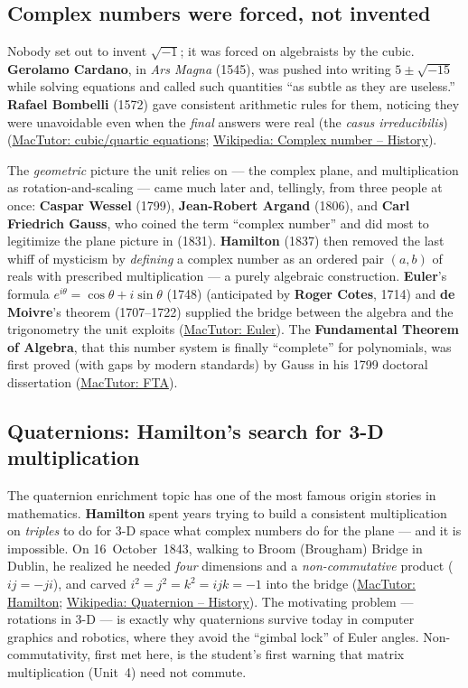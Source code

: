 \documentclass[11pt]{article}
\newcommand{\who}[1]{{\sffamily\bfseries #1}}
\newcommand{\yr}[1]{{\sffamily\color{BrickRed}(#1)}}
\begin{document}
\subsection{Complex numbers were forced, not invented}
Nobody set out to invent $\sqrt{-1}$; it was forced on algebraists by the cubic.
\who{Gerolamo Cardano}, in \emph{Ars Magna} \yr{1545}, was pushed into writing
$5\pm\sqrt{-15}$ while solving equations and called such quantities ``as subtle as
they are useless.'' \who{Rafael Bombelli} \yr{1572} gave consistent arithmetic
rules for them, noticing they were unavoidable even when the \emph{final} answers
were real (the \emph{casus irreducibilis})
(\href{https://mathshistory.st-andrews.ac.uk/HistTopics/Quadratic_etc_equations/}{MacTutor:
cubic/quartic equations};
\href{https://en.wikipedia.org/wiki/Complex_number\#History}{Wikipedia: Complex
number -- History}).

The \emph{geometric} picture the unit relies on --- the complex plane, and
multiplication as rotation-and-scaling --- came much later and, tellingly, from
three people at once: \who{Caspar Wessel} \yr{1799}, \who{Jean-Robert Argand}
\yr{1806}, and \who{Carl Friedrich Gauss}, who coined the term ``complex number''
and did most to legitimize the plane picture in \yr{1831}. \who{Hamilton}
\yr{1837} then removed the last whiff of mysticism by \emph{defining} a complex
number as an ordered pair $(a,b)$ of reals with prescribed multiplication --- a
purely algebraic construction. \who{Euler}'s formula
$e^{i\theta}=\cos\theta+i\sin\theta$ \yr{1748} (anticipated by \who{Roger Cotes},
1714) and \who{de Moivre}'s theorem \yr{1707--1722} supplied the bridge between the
algebra and the trigonometry the unit exploits
(\href{https://mathshistory.st-andrews.ac.uk/Biographies/Euler/}{MacTutor: Euler}).
The \who{Fundamental Theorem of Algebra}, that this number system is finally
``complete'' for polynomials, was first proved (with gaps by modern standards) by
Gauss in his 1799 doctoral dissertation
(\href{https://mathshistory.st-andrews.ac.uk/HistTopics/Fund_theorem_of_algebra/}{MacTutor:
FTA}).

\subsection{Quaternions: Hamilton's search for 3-D multiplication}
The quaternion enrichment topic has one of the most famous origin stories in
mathematics. \who{Hamilton} spent years trying to build a consistent
multiplication on \emph{triples} to do for 3-D space what complex numbers do for
the plane --- and it is impossible. On 16~October~1843, walking to Broom (Brougham)
Bridge in Dublin, he realized he needed \emph{four} dimensions and a
\emph{non-commutative} product ($ij=-ji$), and carved $i^2=j^2=k^2=ijk=-1$ into the
bridge (\href{https://mathshistory.st-andrews.ac.uk/Biographies/Hamilton/}{MacTutor:
Hamilton}; \href{https://en.wikipedia.org/wiki/Quaternion\#History}{Wikipedia:
Quaternion -- History}). The motivating problem --- rotations in 3-D --- is exactly
why quaternions survive today in computer graphics and robotics, where they avoid
the ``gimbal lock'' of Euler angles. Non-commutativity, first met here, is the
student's first warning that matrix multiplication (Unit~4) need not commute.
\end{document}

